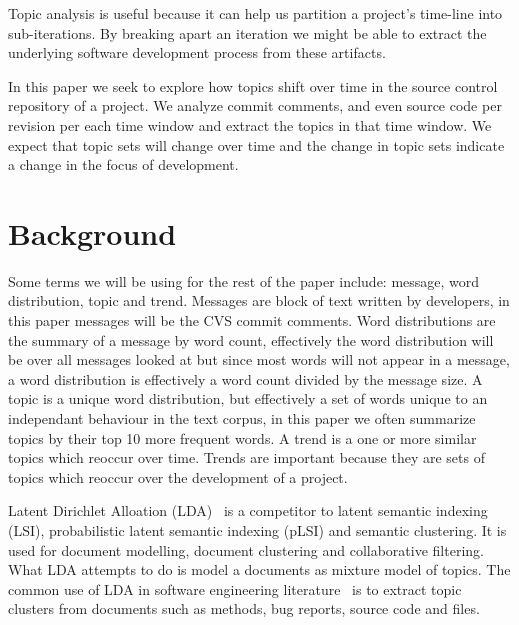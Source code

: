 \documentclass[times, 10pt,twocolumn]{article}
\begin{document}
Topic analysis is useful because it can help us partition a project's
time-line into sub-iterations. By breaking apart an iteration we might
be able to extract the underlying software development process from
these artifacts.

In this paper we seek to explore how topics shift over time in
the source control repository of a project. We analyze commit
comments, and even source code per revision per each time window and
extract the topics in that time window. We expect that topic sets
will change over time and the change in topic sets indicate a change
in the focus of development. 



\section{Background}


Some terms we will be using for the rest of the paper include:
message, word distribution, topic and trend. Messages are block of
text written by developers, in this paper messages will be the CVS
commit comments. Word distributions are the summary of a message by
word count, effectively the word distribution will be over all
messages looked at but since most words will not appear in a message,
a word distribution is effectively a word count divided by the message
size. A topic is a unique word distribution, but effectively a set of
words unique to an independant behaviour in the text corpus, in this
paper we often summarize topics by their top 10 more frequent words.
A trend is a one or more similar topics which reoccur over
time. Trends are important because they are sets of topics which
reoccur over the development of a project.





Latent Dirichlet Alloation (LDA)~\cite{944937} is a competitor to
latent semantic indexing (LSI), probabilistic latent semantic indexing
(pLSI) and semantic clustering. It is used for document modelling,
document clustering and collaborative filtering. What LDA attempts to
do is model a documents as mixture model of topics.  The common use of
LDA in software engineering
literature~\cite{lukins2008,10.1109/MSR.2007.20,NIPS2007637,1321709}
is to extract topic clusters from documents such as methods, bug
reports, source code and files.
\end{document}
